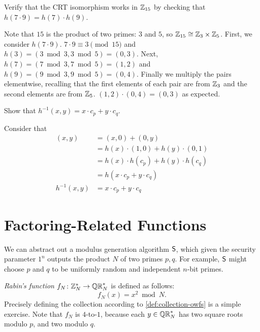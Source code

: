 \documentclass[11pt]{article}
\begin{document}
\begin{question}
    Verify that the CRT isomorphism works in $\mathbb{Z}_{15}$ by checking that $h(7 \cdot 9) = h(7) \cdot h(9)$.
\end{question}
\begin{answer}
    Note that $15$ is the product of two primes: $3$ and $5$, so \(\mathbb{Z}_{15} \cong \mathbb{Z}_3
    \times \mathbb{Z}_5\).  First, we consider \(h(7 \cdot 9)\). \(7 \cdot 9 \equiv 3 \pmod{15}\)
    and \(h(3) = (3 \bmod 3, 3 \bmod 5) = (0, 3)\). Next, \(h(7) = (7 \bmod{3}, 7
    \bmod{5}) = (1,2)\) and \(h(9) = (9 \bmod{3}, 9 \bmod 5) = (0, 4)\). Finally we
    multiply the pairs elementwise, recalling that the first elements of each pair are
    from \(\mathbb{Z}_3\) and the second elements are from \(\mathbb{Z}_5\).  \((1,2) \cdot (0,4) =
    (0,3)\) as expected.
\end{answer}
\begin{question}
    Show that \(h^{-1}(x,y) = x \cdot c_p + y \cdot c_q\).
\end{question}
\begin{answer}
    Consider that
    \begin{align*}
        (x,y) &= (x, 0) + (0, y) \\
              &= h(x) \cdot (1,0) + h(y) \cdot (0,1) \\
              &= h(x) \cdot h(c_p) + h(y) \cdot h(c_q) \\
              &= h(x \cdot c_p + y \cdot c_q) \\
        h^{-1}(x,y) &= x \cdot c_p + y \cdot c_q
    \end{align*}
\end{answer}

\section{Factoring-Related Functions}
\label{sec:fact-related}

We can abstract out a modulus generation algorithm $\mathsf{S}$, which
given the security parameter $1^{n}$ outputs the product $N$ of two
primes $p,q$.  For example, $\mathsf{S}$ might choose $p$ and $q$ to be
uniformly random and independent $n$-bit primes.

\emph{Rabin's function} $f_{N} \colon \mathbb{Z}_N^{*} \to \mathbb{QR}_{N}^{*}$ is defined
as follows: \[ f_{N}(x) = x^{2} \bmod N. \] Precisely defining the
collection according to \cref{def:collection-owfs} is a
simple exercise.  Note that $f_{N}$ is $4$-to-$1$, because each $y \in
\mathbb{QR}_{N}^{*}$ has two square roots modulo $p$, and two modulo $q$.
\end{document}
